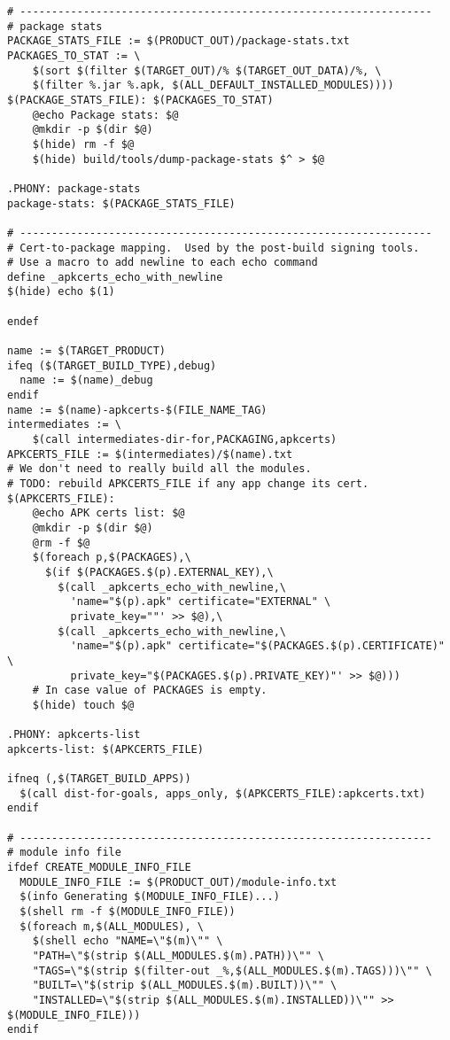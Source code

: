 \documentclass[12pt,a4paper]{article}
\begin{document}
\begin{verbatim}
# -----------------------------------------------------------------
# package stats
PACKAGE_STATS_FILE := $(PRODUCT_OUT)/package-stats.txt
PACKAGES_TO_STAT := \
    $(sort $(filter $(TARGET_OUT)/% $(TARGET_OUT_DATA)/%, \
	$(filter %.jar %.apk, $(ALL_DEFAULT_INSTALLED_MODULES))))
$(PACKAGE_STATS_FILE): $(PACKAGES_TO_STAT)
	@echo Package stats: $@
	@mkdir -p $(dir $@)
	$(hide) rm -f $@
	$(hide) build/tools/dump-package-stats $^ > $@

.PHONY: package-stats
package-stats: $(PACKAGE_STATS_FILE)

# -----------------------------------------------------------------
# Cert-to-package mapping.  Used by the post-build signing tools.
# Use a macro to add newline to each echo command
define _apkcerts_echo_with_newline
$(hide) echo $(1)

endef

name := $(TARGET_PRODUCT)
ifeq ($(TARGET_BUILD_TYPE),debug)
  name := $(name)_debug
endif
name := $(name)-apkcerts-$(FILE_NAME_TAG)
intermediates := \
	$(call intermediates-dir-for,PACKAGING,apkcerts)
APKCERTS_FILE := $(intermediates)/$(name).txt
# We don't need to really build all the modules.
# TODO: rebuild APKCERTS_FILE if any app change its cert.
$(APKCERTS_FILE):
	@echo APK certs list: $@
	@mkdir -p $(dir $@)
	@rm -f $@
	$(foreach p,$(PACKAGES),\
	  $(if $(PACKAGES.$(p).EXTERNAL_KEY),\
	    $(call _apkcerts_echo_with_newline,\
	      'name="$(p).apk" certificate="EXTERNAL" \
	      private_key=""' >> $@),\
	    $(call _apkcerts_echo_with_newline,\
	      'name="$(p).apk" certificate="$(PACKAGES.$(p).CERTIFICATE)" \
	      private_key="$(PACKAGES.$(p).PRIVATE_KEY)"' >> $@)))
	# In case value of PACKAGES is empty.
	$(hide) touch $@

.PHONY: apkcerts-list
apkcerts-list: $(APKCERTS_FILE)

ifneq (,$(TARGET_BUILD_APPS))
  $(call dist-for-goals, apps_only, $(APKCERTS_FILE):apkcerts.txt)
endif

# -----------------------------------------------------------------
# module info file
ifdef CREATE_MODULE_INFO_FILE
  MODULE_INFO_FILE := $(PRODUCT_OUT)/module-info.txt
  $(info Generating $(MODULE_INFO_FILE)...)
  $(shell rm -f $(MODULE_INFO_FILE))
  $(foreach m,$(ALL_MODULES), \
    $(shell echo "NAME=\"$(m)\"" \
	"PATH=\"$(strip $(ALL_MODULES.$(m).PATH))\"" \
	"TAGS=\"$(strip $(filter-out _%,$(ALL_MODULES.$(m).TAGS)))\"" \
	"BUILT=\"$(strip $(ALL_MODULES.$(m).BUILT))\"" \
	"INSTALLED=\"$(strip $(ALL_MODULES.$(m).INSTALLED))\"" >> $(MODULE_INFO_FILE)))
endif


\end{verbatim}
\end{document}
